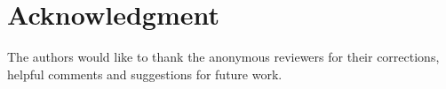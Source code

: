 \documentclass[conference]{IEEEtran}
\newcommand{\Az}[1]{{\color{black}{#1}}}
\begin{document}


%




\section*{Acknowledgment}

The authors would like to thank the anonymous reviewers for their corrections, helpful comments and suggestions for future work.








%
%
%




\end{document}

